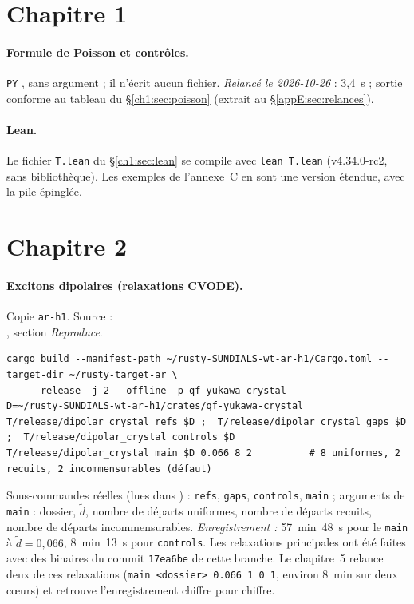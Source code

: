 \section{Chapitre 1}\label{appE:sec:ch1}

\paragraph{Formule de Poisson et contrôles.} \texttt{PY} , sans
argument ; il n'écrit aucun fichier. \emph{Relancé le 2026-10-26} : 3,4~s ; sortie conforme au tableau du
§\ref{ch1:sec:poisson} (extrait au §\ref{appE:sec:relances}).

\paragraph{Lean.} Le fichier \texttt{T.lean} du §\ref{ch1:sec:lean} se compile avec \texttt{lean T.lean} (v4.34.0-rc2,
sans bibliothèque). Les exemples de l'annexe~C en sont une version étendue, avec la pile épinglée.

\section{Chapitre 2}\label{appE:sec:ch2}

\paragraph{Excitons dipolaires (relaxations CVODE).} Copie \texttt{ar-h1}. Source :\\ , section \emph{Reproduce}.
\begin{lstlisting}[style=appC,language={}]
cargo build --manifest-path ~/rusty-SUNDIALS-wt-ar-h1/Cargo.toml --target-dir ~/rusty-target-ar \
    --release -j 2 --offline -p qf-yukawa-crystal
D=~/rusty-SUNDIALS-wt-ar-h1/crates/qf-yukawa-crystal
T/release/dipolar_crystal refs $D ;  T/release/dipolar_crystal gaps $D ;  T/release/dipolar_crystal controls $D
T/release/dipolar_crystal main $D 0.066 8 2          # 8 uniformes, 2 recuits, 2 incommensurables (défaut)
\end{lstlisting}
Sous-commandes réelles (lues dans ) : \texttt{refs}, \texttt{gaps},
\texttt{controls}, \texttt{main} ; arguments de \texttt{main} : dossier, $\tilde d$, nombre de départs uniformes,
nombre de départs recuits, nombre de départs incommensurables. \emph{Enregistrement :} 57~min~48~s pour le \texttt{main}
à $\tilde d=0{,}066$, 8~min~13~s pour \texttt{controls}. Les relaxations principales ont été faites avec des binaires
du commit \texttt{17ea6be} de cette branche. Le chapitre~5 relance deux de ces relaxations
(\texttt{main <dossier> 0.066 1 0 1}, environ 8~min sur deux cœurs) et retrouve l'enregistrement chiffre pour chiffre.

